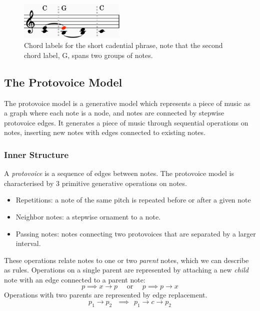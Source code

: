 \documentclass[12pt,a4paper,twoside,openright]{report}
\theoremstyle{definition}
\begin{document}
\begin{figure}
  \centering
  \includegraphics[width=0.45\textwidth]{prep/cadenceharmony}
  \captionsetup{width=.9\linewidth}
  \caption{Chord labels for the short cadential phrase, note that the second chord label, G, spans two groups of notes.}
  \label{fig:cadenceHarmony}
\end{figure}

\FloatBarrier

\subsection{The Protovoice Model} %
\par
The protovoice model is a generative model which represents a piece of music as a graph where each note is a node, and notes are connected by stepwise protovoice edges. It generates a piece of music through sequential operations on notes, inserting new notes with edges connected to existing notes.


\par 
\subsubsection{Inner Structure} %
\label{sub:Inner Structure}

A \textit{protovoice} is a sequence of edges between notes. The protovoice model is characterised by 3 primitive generative operations on notes.
\par 

\begin{itemize}
  \item Repetitions: a note of the same pitch is repeated before or after a given note
  \item Neighbor notes: a stepwise ornament to a note. 
  \item Passing notes: notes connecting two protovoices that are separated by a larger interval.
\end{itemize}

These operations relate notes to one or two \textit{parent} notes, which we can describe as rules. Operations on a single parent are represented by attaching a new \textit{child} note with an edge connected to a parent note: 
\begin{equation}
  p \implies x \to p \text{~~~~or~~~~} p \implies p \to x 
  \label{eq:singlesidedinnerop}
\end{equation}
Operations with two parents are represented by edge replacement. 
\begin{equation}
  p_1 \to p_2 ~~~\implies~~ p_1 \to c \to p_2 \label{edge replacement}
  \label{eq:doublesidedinnerop}
\end{equation}
\end{document}
